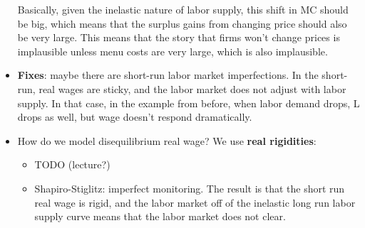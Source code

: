 \documentclass[12pt]{article}
\begin{document}
\begin{itemize}
\begin{center}
    \end{center}
    Basically, given the inelastic nature of labor supply, this shift in MC should be big, which means that the surplus gains from changing price should also be very large. This means that the story that firms won't change prices is implausible unless menu costs are very large, which is also implausible.
    \item \textbf{Fixes}: maybe there are short-run labor market imperfections. In the short-run, real wages are sticky, and the labor market does not adjust with labor supply. In that case, in the example from before, when labor demand drops, L drops as well, but wage doesn't respond dramatically. 
    \item How do we model disequilibrium real wage? We use \textbf{real rigidities}:
    \begin{itemize}
        \item TODO (lecture?)
        \item Shapiro-Stiglitz: imperfect monitoring. The result is that the short run real wage is rigid, and the labor market off of the inelastic long run labor supply curve means that the labor market does not clear.
    \end{itemize}
\end{itemize}
\end{document}
